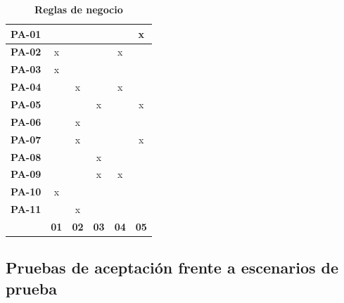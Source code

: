 \begin{table}[H]
	\centering
	\caption{\textbf{Reglas de negocio}}
	\label{Reglas de negocio}
	\begin{tabular}{|c|c|c|c|c|c|}
		\hline
		\textbf{PA-01} &             &             &             &             & x           \\ \hline
		\textbf{PA-02} & x           &             &             & x           &             \\ \hline
		\textbf{PA-03} & x           &             &             &             &             \\ \hline
		\textbf{PA-04} &             & x           &             & x           &             \\ \hline
		\textbf{PA-05} &             &             & x           &             & x           \\ \hline
		\textbf{PA-06} &             & x           &             &             &             \\ \hline
		\textbf{PA-07} &             & x           &             &             & x           \\ \hline
		\textbf{PA-08} &             &             & x           &             &             \\ \hline
		\textbf{PA-09} &             &             & x           & x           &             \\ \hline
		\textbf{PA-10} & x           &             &             &             &             \\ \hline
		\textbf{PA-11} &             & x           &             &             &             \\ \hline
		\textbf{}      & \textbf{01} & \textbf{02} & \textbf{03} & \textbf{04} & \textbf{05} \\ \hline
	\end{tabular}
\end{table}

\subsection{Pruebas de aceptación frente a escenarios de prueba}

